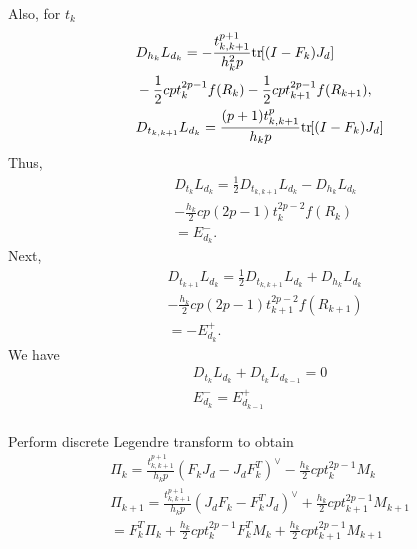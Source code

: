 \documentclass[letterpaper, 10pt, conference]{ieeeconf}
\newcommand{\bracket}[1]{\ensuremath{\left[ #1 \right]}}
\newcommand{\tr}[1]{\mbox{tr}\ensuremath{\negthickspace\bracket{#1}}}
\begin{document}
Also, for $t_k$
\begin{align*}
    & D_{h_k} L_{d_k} = -\frac{t^{p+1}_{k,k+1}}{h_k^2 p} \tr{(I-F_k)J_d}\\
    & - \frac{1}{2}c p t_k^{2p-1} f(R_k) - \frac{1}{2}c p t_{k+1}^{2p-1} f(R_{k+1}),\\
    & D_{t_{k,k+1}} L_{d_k} = \frac{(p+1)t_{k,k+1}^p}{h_k p} \tr{(I-F_k)J_d}  
\end{align*}
Thus,
\begin{align*}
    & D_{t_k} L_{d_k} = \frac{1}{2} D_{t_{k,k+1}} L_{d_k} - D_{h_k} L_{d_k} \\
    & -\frac{h_k}{2} c p (2p-1) t_k^{2p-2} f(R_k) \\
    & = E^-_{d_k}.
\end{align*}
Next,
\begin{align*}
    & D_{t_{k+1}} L_{d_k} = \frac{1}{2} D_{t_{k,k+1}} L_{d_k} + D_{h_k} L_{d_k} \\
    & -\frac{h_k}{2} c p (2p-1) t_{k+1}^{2p-2} f(R_{k+1}) \\
    & = - E^+_{d_k}.
\end{align*}
We have
\begin{gather*}
    D_{t_k} L_{d_k} + D_{t_k} L_{d_{k-1}} = 0\\
    E^-_{d_k} = E^+_{d_{k-1}} \\
\end{gather*}

Perform discrete Legendre transform to obtain
\begin{gather*}
    \Pi_k =\frac{t_{k,k+1}^{p+1} }{h_k p} (F_k J_d - J_dF_k^T)^\vee  -\frac{h_k}{2} cp t_k^{2p-1} M_k \\
    \Pi_{k+1} = \frac{t_{k,k+1}^{p+1} }{h_k p} (J_dF_k -F_k^T J_d)^\vee + \frac{h_k}{2} cpt^{2p-1}_{k+1} M_{k+1}\\
= F_k^T \Pi_k + \frac{h_k}{2} cp t_k^{2p-1} F_k^T M_k +\frac{h_k}{2} cpt^{2p-1}_{k+1} M_{k+1}
\end{gather*}
\end{document}
